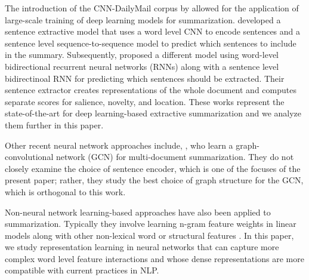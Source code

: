
The introduction of the CNN-DailyMail corpus by \citet{nips15_hermann} 
allowed for the application of large-scale training of deep learning models 
for summarization.
\citet{cheng2016neural} developed a sentence extractive model that uses a 
word level CNN to encode sentences and a sentence level sequence-to-sequence 
model to predict which sentences to include in the summary. Subsequently, 
\citet{nallapati2017summarunner} proposed a different model using word-level 
bidirectional recurrent neural networks (RNNs) along with a sentence level 
bidirectinoal RNN for predicting which sentences should be extracted. 
Their sentence extractor creates representations of the whole document and 
computes separate scores for salience, novelty, and location.
These works represent the state-of-the-art for deep learning-based extractive
summarization and we analyze them further in this paper.

Other recent neural network approaches include, \citet{yasunaga2017graph},
who learn a graph-convolutional network (GCN) for multi-document summarization.
They do not 
closely examine the choice of sentence encoder, which is one of the focuses
of the present paper; rather, they study the best choice of graph 
structure for the GCN, which is orthogonal to this work. 

Non-neural network learning-based approaches have also been applied
to summarization. Typically they involve learning n-gram feature weights 
in linear models along with other non-lexical word or 
structural features 
\cite{berg2011jointly,sipos2012large,durrett2016learning}.
In this paper, we study representation learning in
neural networks that can capture more complex word level feature interactions
and whose dense representations are more compatible with current practices
in NLP.








